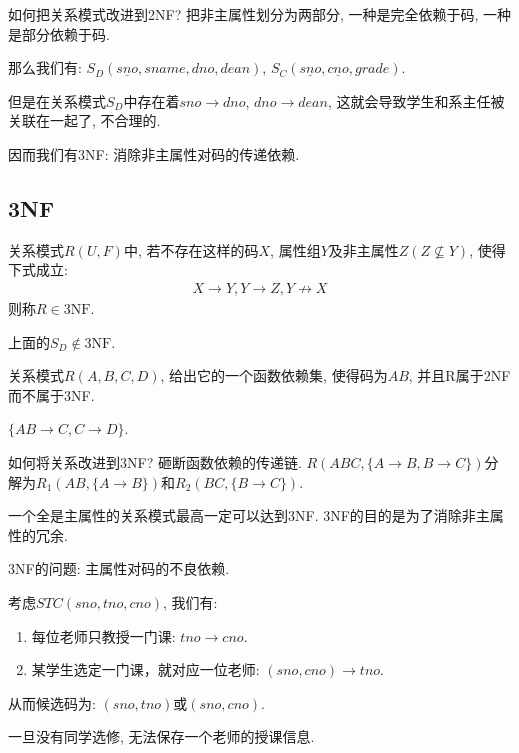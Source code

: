 如何把关系模式改进到2NF? 把非主属性划分为两部分, 一种是完全依赖于码, 一种是部分依赖于码.

那么我们有: $S_D(\underline{sno},sname,dno,dean)$, $S_C(\underline{sno}, \underline{cno}, grade)$.

但是在关系模式$S_D$中存在着$sno\to dno$, $dno \to dean$, 这就会导致学生和系主任被关联在一起了, 不合理的.

因而我们有3NF: 消除非主属性对码的传递依赖.

\subsection{3NF}

\begin{definition}[3NF]
  关系模式$R(U,F)$中, 若不存在这样的码$X$, 属性组$Y$及非主属性$Z(Z\nsubseteq Y)$, 使得下式成立:
  \begin{align*}
      X\to Y, Y\to Z, Y\nrightarrow X
  \end{align*}
  则称$R\in 3\text{NF}$.
\end{definition}

上面的$S_D \notin 3\text{NF}$.

\begin{example}
  关系模式$R(A,B,C,D)$, 给出它的一个函数依赖集, 使得码为$AB$, 并且R属于2NF而不属于3NF.

  $\{AB\to C, C\to D\}$.
\end{example}

如何将关系改进到3NF? 砸断函数依赖的传递链. $R(ABC,\{A\to B,B\to C\})$分解为$R_1(AB,\{A\to B\})$和$R_2(BC,\{B\to C\})$.

\begin{remark}
  一个全是主属性的关系模式最高一定可以达到3NF. 3NF的目的是为了消除非主属性的冗余.
\end{remark}

3NF的问题: 主属性对码的不良依赖.

\begin{example}
  考虑$STC(sno,tno,cno)$, 我们有:
  \begin{enumerate}
      \item 每位老师只教授一门课: $tno \to cno$.
      \item 某学生选定一门课，就对应一位老师: $(sno,cno)\to tno$.
  \end{enumerate}

  从而候选码为: $(sno, tno)$或$(sno,cno)$. 
  
  一旦没有同学选修, 无法保存一个老师的授课信息.
\end{example}

